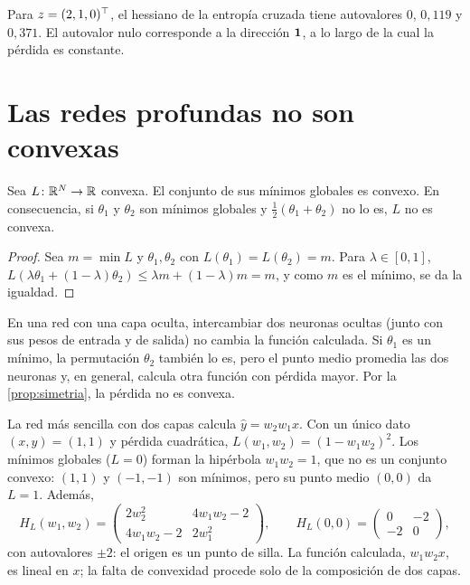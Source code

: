 Para $z=(2,1,0)^{\top}$, el hessiano de la entropía cruzada tiene autovalores $0$, $0{,}119$ y $0{,}371$. El autovalor nulo corresponde a la dirección $\mathbf{1}$, a lo largo de la cual la pérdida es constante.

\section{Las redes profundas no son convexas}

\begin{proposicion}\label{prop:simetria}
Sea $L\colon\mathbb{R}^{N}\to\mathbb{R}$ convexa. El conjunto de sus mínimos globales es convexo. En consecuencia, si $\theta_1$ y $\theta_2$ son mínimos globales y $\tfrac12(\theta_1+\theta_2)$ no lo es, $L$ no es convexa.
\end{proposicion}

\begin{proof}
Sea $m=\min L$ y $\theta_1,\theta_2$ con $L(\theta_1)=L(\theta_2)=m$. Para $\lambda\in[0,1]$, $L(\lambda\theta_1+(1-\lambda)\theta_2)\le\lambda m+(1-\lambda)m=m$, y como $m$ es el mínimo, se da la igualdad.
\end{proof}

En una red con una capa oculta, intercambiar dos neuronas ocultas (junto con sus pesos de entrada y de salida) no cambia la función calculada. Si $\theta_1$ es un mínimo, la permutación $\theta_2$ también lo es, pero el punto medio promedia las dos neuronas y, en general, calcula otra función con pérdida mayor. Por la \cref{prop:simetria}, la pérdida no es convexa.

\begin{ejemplo}\label{ej:red-lineal}
La red más sencilla con dos capas calcula $\hat y=w_2w_1x$. Con un único dato $(x,y)=(1,1)$ y pérdida cuadrática, $L(w_1,w_2)=(1-w_1w_2)^{2}$. Los mínimos globales ($L=0$) forman la hipérbola $w_1w_2=1$, que no es un conjunto convexo: $(1,1)$ y $(-1,-1)$ son mínimos, pero su punto medio $(0,0)$ da $L=1$. Además,
\[
H_L(w_1,w_2)=\begin{pmatrix}2w_2^{2}&4w_1w_2-2\\4w_1w_2-2&2w_1^{2}\end{pmatrix},\qquad H_L(0,0)=\begin{pmatrix}0&-2\\-2&0\end{pmatrix},
\]
con autovalores $\pm 2$: el origen es un punto de silla. La función calculada, $w_1w_2x$, es lineal en $x$; la falta de convexidad procede solo de la composición de dos capas.
\end{ejemplo}

